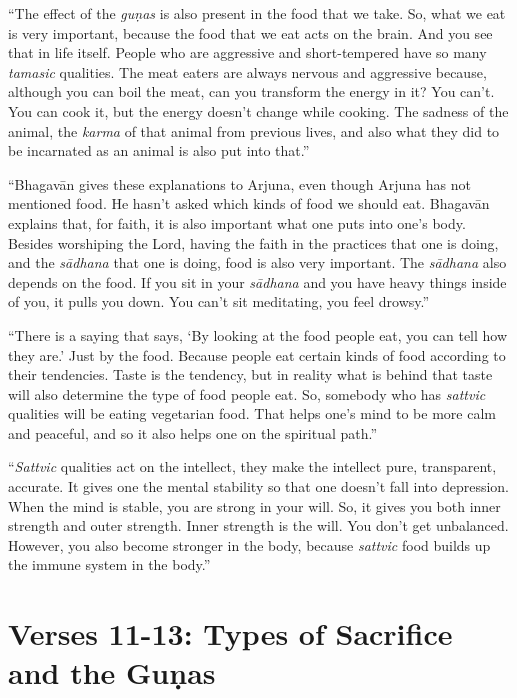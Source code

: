 \enquote{The effect of the \textit{guṇas} is also present in the food that we take. So, what we eat is very important, because the food that we eat acts on the brain. And you see that in life itself. People who are aggressive and short-tempered have so many \textit{tamasic} qualities. The meat eaters are always nervous and aggressive because, although you can boil the meat, can you transform the energy in it? You can’t. You can cook it, but the energy doesn’t change while cooking. The sadness of the animal, the \textit{karma} of that animal from previous lives, and also what they did to be incarnated as an animal is also put into that.}

\enquote{Bhagavān gives these explanations to Arjuna, even though Arjuna has not mentioned food. He hasn’t asked which kinds of food we should eat. Bhagavān explains that, for faith, it is also important what one puts into one’s body. Besides worshiping the Lord, having the faith in the practices that one is doing, and the \textit{sādhana} that one is doing, food is also very important. The \textit{sādhana} also depends on the food. If you sit in your \textit{sādhana} and you have heavy things inside of you, it pulls you down. You can’t sit meditating, you feel drowsy.}

\enquote{There is a saying that says, \enquote{By looking at the food people eat, you can tell how they are.} Just by the food. Because people eat certain kinds of food according to their tendencies. Taste is the tendency, but in reality what is behind that taste will also determine the type of food people eat. So, somebody who has \textit{sattvic} qualities will be eating vegetarian food. That helps one’s mind to be more calm and peaceful, and so it also helps one on the spiritual path.}

\enquote{\textit{Sattvic} qualities act on the intellect, they make the intellect pure, transparent, accurate. It gives one the mental stability so that one doesn’t fall into depression. When the mind is stable, you are strong in your will. So, it gives you both inner strength and outer strength. Inner strength is the will. You don’t get unbalanced. However, you also become stronger in the body, because \textit{sattvic} food builds up the immune system in the body.}

\section{Verses 11-13: Types of Sacrifice and the Guṇas}\label{sec-verses-11-13-types-of-sacrifice-and-the-gunas}


